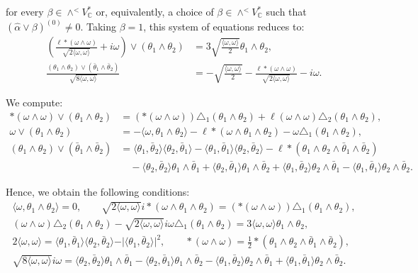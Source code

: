 \documentclass[10pt,a4paper,twoside,reqno]{amsart}
\theoremstyle{plain}
\theoremstyle{definition}
\theoremstyle{remark}
\def\C{\mathbb{C}}
\newcommand{\escal}[1]{\langle#1\rangle}
\begin{document}
\noindent
for every $\beta\in \wedge^<V^{\ast}_{\C}$ or, equivalently, a choice of $\beta\in \wedge^< V^{\ast}_{\C}$ such that $(\widehat{\alpha} \vee \beta)^{(0)}  \neq 0$. Taking $\beta = 1$, this system of equations reduces to:
\begin{align*}
\left(\frac{\ell *(\omega\wedge\omega)}{\sqrt{2\escal{\omega,\omega}}}+i\omega\right)\vee(\theta_1\wedge\theta_2)&=3\sqrt{\frac{\escal{\omega,\omega}}{2}}\theta_1\wedge\theta_2,\\
\frac{(\theta_1 \wedge \theta_2) \vee (\bar{\theta}_1 \wedge \bar{\theta}_2)}{ \sqrt{8 \escal{\omega,\omega}}}&=-\sqrt{\frac{\escal{\omega,\omega}}{2}} - \frac{\ell *(\omega\wedge\omega)}{\sqrt{2\escal{\omega,\omega}}} - i\omega.
\end{align*}

We compute:
\begin{align*}
*(\omega\wedge\omega)\vee(\theta_1\wedge\theta_2)&=(*(\omega\wedge\omega))\triangle_1(\theta_1\wedge\theta_2)+\ell(\omega\wedge\omega)\triangle_2(\theta_1\wedge\theta_2),\\
\omega\vee(\theta_1\wedge\theta_2)&=-\escal{\omega,\theta_1\wedge\theta_2}-\ell*(\omega\wedge\theta_1\wedge\theta_2)-\omega\triangle_1(\theta_1\wedge\theta_2),\\
(\theta_1 \wedge \theta_2) \vee (\bar{\theta}_1 \wedge \bar{\theta}_2)&=\escal{\theta_1,\bar\theta_2}\escal{\theta_2,\bar\theta_1}-\escal{\theta_1,\bar\theta_1}\escal{\theta_2,\bar\theta_2}-\ell*(\theta_1\wedge\theta_2\wedge\bar\theta_1\wedge\bar\theta_2)\\
&\quad-\escal{\theta_2,\bar\theta_2}\theta_1\wedge\bar\theta_1+\escal{\theta_2,\bar\theta_1}\theta_1\wedge\bar\theta_2+\escal{\theta_1,\bar\theta_2}\theta_2\wedge\bar\theta_1-\escal{\theta_1,\bar\theta_1}\theta_2\wedge\bar\theta_2.
\end{align*}

Hence, we obtain the following conditions:
\begin{gather*}
\escal{\omega,\theta_1\wedge\theta_2}=0,\qquad \sqrt{2\escal{\omega,\omega}}i*(\omega\wedge\theta_1\wedge\theta_2)=(*(\omega\wedge\omega))\triangle_1(\theta_1\wedge\theta_2),\\
(\omega\wedge\omega)\triangle_2(\theta_1\wedge\theta_2)-\sqrt{2\escal{\omega,\omega}}i\omega\triangle_1(\theta_1\wedge\theta_2)=3\escal{\omega,\omega}\theta_1\wedge\theta_2,\\
2\escal{\omega,\omega}=\escal{\theta_1,\bar\theta_1}\escal{\theta_2,\bar\theta_2}-\vert\escal{\theta_1,\bar\theta_2}\vert^2,\qquad *(\omega\wedge\omega)=\tfrac{1}{2}*(\theta_1\wedge\theta_2\wedge\bar\theta_1\wedge\bar\theta_2),\\
\sqrt{8 \escal{\omega,\omega}}i\omega=\escal{\theta_2,\bar\theta_2}\theta_1\wedge\bar\theta_1-\escal{\theta_2,\bar\theta_1}\theta_1\wedge\bar\theta_2-\escal{\theta_1,\bar\theta_2}\theta_2\wedge\bar\theta_1+\escal{\theta_1,\bar\theta_1}\theta_2\wedge\bar\theta_2.
\end{gather*}
\end{document}

